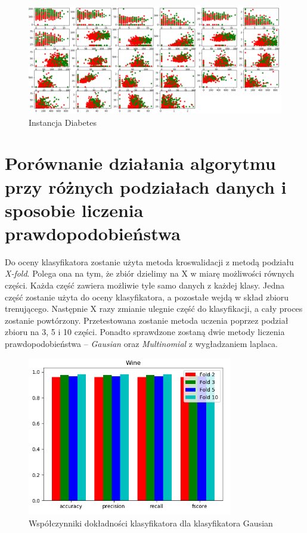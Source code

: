 \documentclass[12pt,a4paper]{article}
\begin{document}
\begin{figure}[H]
\centering
\includegraphics[width=1\textwidth]{diabetesData.PNG}
\caption{Instancja Diabetes}
\end{figure}


\section{Porównanie działania algorytmu przy różnych podziałach danych i sposobie liczenia prawdopodobieństwa}
Do oceny klasyfikatora zostanie użyta metoda kroswalidacji z metodą podziału \emph{X-fold}. Polega ona na tym, że zbiór dzielimy na X w miarę możliwości równych części. Każda część zawiera możliwie tyle samo danych z każdej klasy. Jedna część zostanie użyta do oceny klasyfikatora, a pozostałe wejdą w skład zbioru trenującego. Następnie X razy zmianie ulegnie część do klasyfikacji, a cały proces zostanie powtórzony. 
Przetestowana zostanie metoda uczenia poprzez podział zbioru na 3, 5 i 10 części. Ponadto sprawdzone zostaną dwie metody liczenia prawdopodobieństwa – \emph{Gausian} oraz \emph{Multinomial} z wygładzaniem laplaca.

\begin{figure}[H]
\centering
\includegraphics[width=0.8\textwidth]{gMeasure.PNG}
\caption{Współczynniki dokładności klasyfikatora dla klasyfikatora Gausian}
\end{figure}
\end{document}

